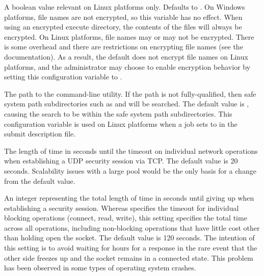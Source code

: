 \begin{description}
\label{param:EncryptExecuteDirectoryFilenames}
\item[\Macro{ENCRYPT\_EXECUTE\_DIRECTORY\_FILENAMES}]
  A boolean value relevant on Linux platforms only.
  Defaults to .
  On Windows platforms, file names are not encrypted,
  so this variable has no effect.  
  When using an encrypted execute directory, 
  the contents of the files will always be encrypted.  
  On Linux platforms, file names may or may not be encrypted. 
  There is some overhead and there are restrictions on encrypting file names
  (see the  documentation).  
  As a result, the default does not encrypt file names on Linux platforms, 
  and the administrator may choose to enable encryption behavior 
  by setting this configuration variable to .

\label{param:EcryptfsAddPassphrase}
\item[\Macro{ECRYPTFS\_ADD\_PASSPHRASE}]
  The path to the  command-line utility. 
  If the path is not fully-qualified, 
  then safe system path subdirectories such as  and
   will be searched.  
  The default value is ,
  causing the search to be within the safe system path subdirectories.
  This configuration variable is used on Linux platforms when a job
  sets  to  in the
  submit description file.

\label{param:SecTCPSessionTimeout}
\item[\Macro{SEC\_TCP\_SESSION\_TIMEOUT}]
  The length of time in seconds until the timeout
  on individual network operations when establishing a UDP security
  session via TCP.
  The default value is 20 seconds.
  Scalability issues with a large pool would be the only basis
  for a change from the default value.

\label{param:SecTCPSessionDeadline}
\item[\Macro{SEC\_TCP\_SESSION\_DEADLINE}]
  An integer representing the total length of time in seconds until giving up
  when establishing a security session.  Whereas
   specifies the timeout
  for individual blocking operations (connect, read, write), this
  setting specifies the total time across all operations, including
  non-blocking operations that have little cost other than holding
  open the socket.
  The default value is 120 seconds.
  The intention of this setting is to avoid waiting for hours
  for a response in the rare event that the other side
  freezes up and the socket remains in a connected state.
  This problem has been observed in some types of operating system
  crashes.


\end{description}
